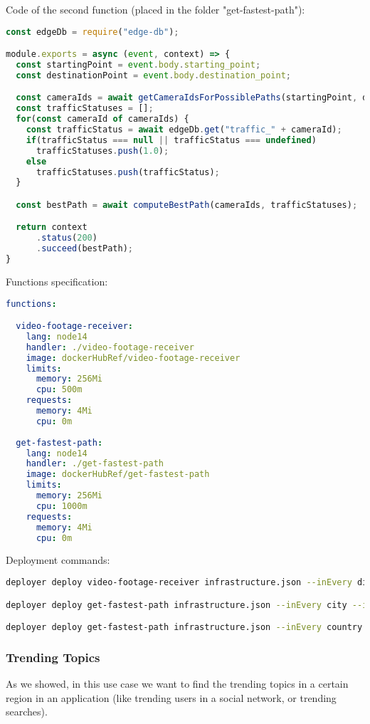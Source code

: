 Code of the second function (placed in the folder "get-fastest-path"):
\begin{lstlisting}[language=javascript]
const edgeDb = require("edge-db");

module.exports = async (event, context) => {
  const startingPoint = event.body.starting_point;
  const destinationPoint = event.body.destination_point;

  const cameraIds = await getCameraIdsForPossiblePaths(startingPoint, destinationPoint);
  const trafficStatuses = [];
  for(const cameraId of cameraIds) {
    const trafficStatus = await edgeDb.get("traffic_" + cameraId);
    if(trafficStatus === null || trafficStatus === undefined)
      trafficStatuses.push(1.0);
    else
      trafficStatuses.push(trafficStatus);
  }

  const bestPath = await computeBestPath(cameraIds, trafficStatuses);

  return context
      .status(200)
      .succeed(bestPath);
}
\end{lstlisting}

Functions specification:
\begin{lstlisting}[language=yaml,firstnumber=1]
functions:

  video-footage-receiver:
    lang: node14
    handler: ./video-footage-receiver
    image: dockerHubRef/video-footage-receiver
    limits:
      memory: 256Mi
      cpu: 500m
    requests:
      memory: 4Mi
      cpu: 0m
      
  get-fastest-path:
    lang: node14
    handler: ./get-fastest-path
    image: dockerHubRef/get-fastest-path
    limits:
      memory: 256Mi
      cpu: 1000m
    requests:
      memory: 4Mi
      cpu: 0m
\end{lstlisting}

Deployment commands:
\begin{lstlisting}[language=bash]
deployer deploy video-footage-receiver infrastructure.json --inEvery district --inAreas us

deployer deploy get-fastest-path infrastructure.json --inEvery city --inAreas us

deployer deploy get-fastest-path infrastructure.json --inEvery country --inAreas us
\end{lstlisting}


\subsubsection{Trending Topics}
As we showed, in this use case we want to find the trending topics in a certain region in an application (like trending users in a social network, or trending searches).

